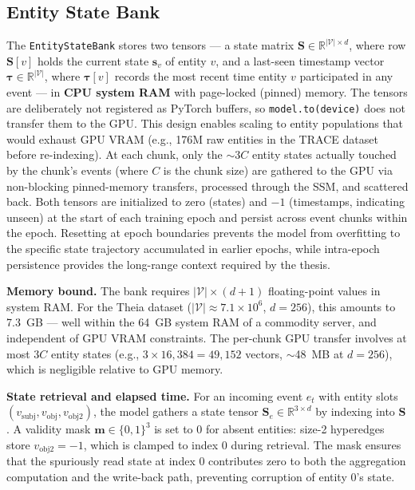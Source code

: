 \documentclass[letterpaper,twocolumn,10pt]{article}
\begin{document}
\subsection{Entity State Bank}
\label{sec:entity_bank}

The \texttt{EntityStateBank} stores two tensors --- a state matrix $\mathbf{S} \in \mathbb{R}^{|\mathcal{V}| \times d}$, where row $\mathbf{S}[v]$ holds the current state $\mathbf{s}_v$ of entity $v$, and a last-seen timestamp vector $\boldsymbol{\tau} \in \mathbb{R}^{|\mathcal{V}|}$, where $\boldsymbol{\tau}[v]$ records the most recent time entity $v$ participated in any event --- in \textbf{CPU system RAM} with page-locked (pinned) memory. The tensors are deliberately not registered as PyTorch buffers, so \texttt{model.to(device)} does not transfer them to the GPU. This design enables scaling to entity populations that would exhaust GPU VRAM (e.g., 176M raw entities in the TRACE dataset before re-indexing). At each chunk, only the $\sim$$3C$ entity states actually touched by the chunk's events (where $C$ is the chunk size) are gathered to the GPU via non-blocking pinned-memory transfers, processed through the SSM, and scattered back. Both tensors are initialized to zero (states) and $-1$ (timestamps, indicating unseen) at the start of each training epoch and persist across event chunks within the epoch. Resetting at epoch boundaries prevents the model from overfitting to the specific state trajectory accumulated in earlier epochs, while intra-epoch persistence provides the long-range context required by the thesis.

\textbf{Memory bound.} The bank requires $|\mathcal{V}| \times (d + 1)$ floating-point values in system RAM. For the Theia dataset ($|\mathcal{V}| \approx 7.1 \times 10^6$, $d = 256$), this amounts to 7.3~GB --- well within the 64~GB system RAM of a commodity server, and independent of GPU VRAM constraints. The per-chunk GPU transfer involves at most $3C$ entity states (e.g., $3 \times 16{,}384 = 49{,}152$ vectors, $\sim$48~MB at $d=256$), which is negligible relative to GPU memory.

\textbf{State retrieval and elapsed time.} For an incoming event $e_t$ with entity slots $(v_{\text{subj}}, v_{\text{obj}}, v_{\text{obj2}})$, the model gathers a state tensor $\mathbf{S}_e \in \mathbb{R}^{3 \times d}$ by indexing into $\mathbf{S}$. A validity mask $\mathbf{m} \in \{0, 1\}^3$ is set to 0 for absent entities: size-2 hyperedges store $v_{\text{obj2}} = -1$, which is clamped to index 0 during retrieval. The mask ensures that the spuriously read state at index 0 contributes zero to both the aggregation computation and the write-back path, preventing corruption of entity 0's state.
\end{document}

